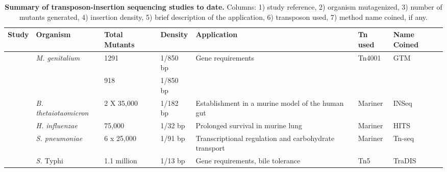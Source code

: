 %
\begingroup
\begin{landscape}
   \tiny
   \noindent
    \begin{longtable}{ l
    				l
				l
				l
				p{2in}
				l
				l}
    \caption[Summary of transposon-insertion sequencing studies to date]{\textbf{Summary of transposon-insertion sequencing studies to date.} Columns: 1) study reference,  2) organism mutagenized, 3) number of mutants generated, 4) insertion density, 5) brief description of the application, 6) transposon used, 7) method name coined, if any.}
    \\
    \toprule
    \textbf{Study} & \textbf{Organism} & \textbf{Total Mutants} & \textbf{Density} & \textbf{Application} & \textbf{Tn used } & \textbf{Name Coined} \\
    \midrule
    \multirow{2}[1]{*}{\textcite{Hutchison1999}}  & \multirow{2}[1]{*}{\textit{M. genitalium}} & 1291  &  1/850 bp & \multirow{2}[1]{2in}{Gene requirements} & \multirow{2}[1]{*}{Tn4001} & \multirow{2}[1]{*}{GTM\nomenclature[Z]{GTM}{Global transposon mutagenesis} } \\
          &  \textit{M. pneumoniae}     & 918   & 1/850 bp &       &       &  \\
    \multirow{2}[0]{*}{\textcite{Goodman2009}} & \multirow{2}[0]{*}{\textit{B. thetaiotaomicron}} & \multirow{2}[0]{*}{2 X 35,000} & \multirow{2}[0]{*}{1/182 bp} & \multirow{2}[0]{2in}{Establishment in a murine model of the human gut} & \multirow{2}[0]{*}{Mariner} & \multirow{2}[0]{*}{INSeq} \\
          &       &       &       &       &       &  \\
    \multirow{2}[0]{*}{\textcite{Gawronski2009} } & \multirow{2}[0]{*}{\textit{H. influenzae}} & \multirow{2}[0]{*}{75,000} & \multirow{2}[0]{*}{1/32 bp} & \multirow{2}[0]{2in}{Prolonged survival in murine lung} & \multirow{2}[0]{*}{Mariner} & \multirow{2}[0]{*}{ HITS} \\
          &       &       &       &       &       &  \\
   \textcite{Opijnen2009}  & \textit{S. pneumoniae} & 6 x 25,000 & 1/91 bp & Transcriptional regulation and carbohydrate transport & Mariner & Tn-seq \\
    \multirow{2}[0]{*}{\textcite{Langridge2009a}}  & \multirow{2}[0]{*}{{\it S.} Typhi} & \multirow{2}[0]{*}{1.1 million} & 1/13 bp & \multirow{2}[0]{2in}{Gene requirements, bile tolerance} & \multirow{2}[0]{*}{Tn5} & \multirow{2}[0]{*}{TraDIS} \\

\end{longtable}
\end{landscape}
